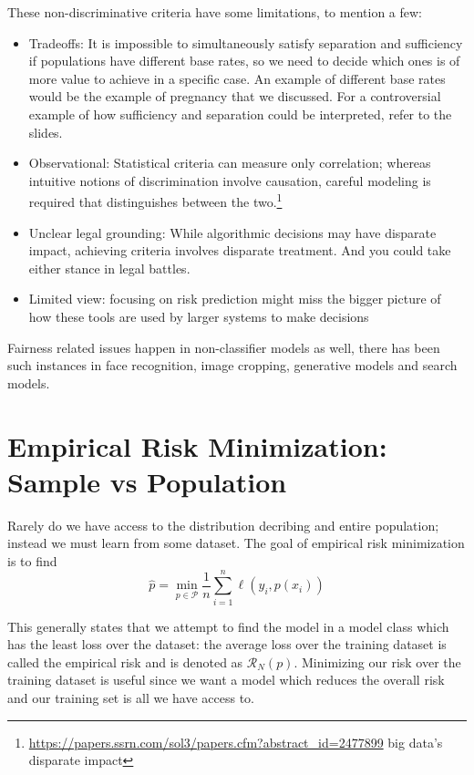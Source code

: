 These non-discriminative criteria have some limitations, to mention a few:
\begin{itemize}
    \item Tradeoffs:  It is impossible to simultaneously satisfy separation and sufficiency if populations have different base rates, so we need to decide which ones is of more value to achieve in a specific case.  An example of different base rates would be the example of pregnancy that we discussed. For a controversial example of how sufficiency and separation could be interpreted, refer to the slides.\cite{kleinberg2016inherent}
    \item Observational: Statistical criteria can measure only correlation; whereas intuitive notions of discrimination involve causation, careful modeling is required that distinguishes between the two.\footnote{\url{https://papers.ssrn.com/sol3/papers.cfm?abstract_id=2477899} {big data's disparate impact}}
    \item Unclear legal grounding: While algorithmic decisions may have disparate impact, achieving criteria involves disparate treatment. And you could take either stance in legal battles.
    \item Limited view: focusing on risk prediction might miss the bigger picture of how these tools are used by larger systems to make decisions
\end{itemize}

Fairness related issues happen in non-classifier models as well, there has been such instances in face recognition, image cropping, generative models and search models.

\section{Empirical Risk Minimization: Sample vs Population}\label{sec:sample_vs_population}

Rarely do we have access to the distribution decribing and entire population; instead we must learn from some dataset. The goal of empirical risk minimization is to find 
$$\hat{p} = \min_{p \in \mathcal{P}}\frac{1}{n} \sum_{i = 1}^{n} \ell(y_i, p(x_i))$$

This generally states that we attempt to find the model in a model class which has the least loss over the dataset: the average loss over the training dataset is called the empirical risk and is denoted as $\mathcal{R}_N(p)$. Minimizing our risk over the training dataset is useful since we want a model which reduces the overall risk and our training set is all we have access to. 

